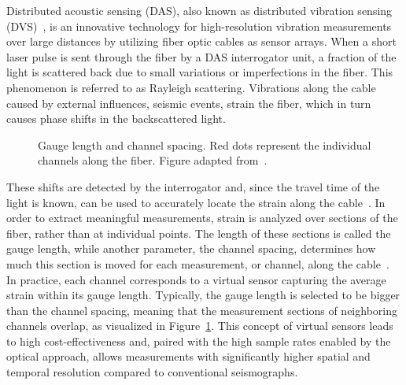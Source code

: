 Distributed acoustic sensing (DAS), also known as distributed vibration sensing (DVS)~\cite{DAS}, is an innovative 
technology for high-resolution vibration measurements over large distances by utilizing fiber optic cables as sensor
arrays.
When a short laser pulse is sent through the fiber by a DAS interrogator unit, a fraction of the light is scattered back
due to small variations or imperfections in the fiber.
This phenomenon is referred to as Rayleigh scattering.
Vibrations along the cable caused by external influences, \eg seismic events, strain the fiber, which in turn causes
phase shifts in the backscattered light.
\begin{figure}
    \centering

    \caption{
        Gauge length and channel spacing. Red dots represent the individual channels along the fiber.
        Figure adapted from~\cite{GaugeLength}.
    }
    \label{fig:gauge-length}
\end{figure}
These shifts are detected by the interrogator and, since the travel time of the light is known, can be used to
accurately locate the strain along the cable~\cite{DAS-N2N}.
In order to extract meaningful measurements, strain is analyzed over sections of the fiber, rather than at individual
points.
The length of these sections is called the gauge length, while another parameter, the channel spacing, determines how
much this section is moved for each measurement, or channel, along the cable~\cite{GaugeLength}.
In practice, each channel corresponds to a virtual sensor capturing the average strain within its gauge length.
Typically, the gauge length is selected to be bigger than the channel spacing, meaning that the measurement sections
of neighboring channels overlap, as visualized in Figure~\ref{fig:gauge-length}.
This concept of virtual sensors leads to high cost-effectiveness and, paired with the high sample rates enabled by the
optical approach, allows measurements with significantly higher spatial and temporal resolution compared to
conventional seismographs.


